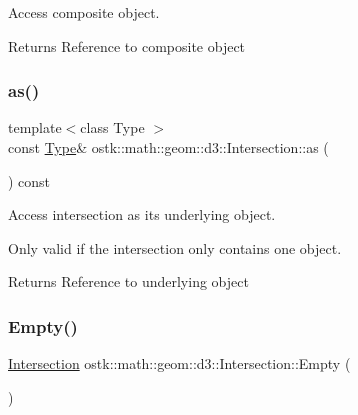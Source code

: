 Access composite object. 

\begin{DoxyReturn}{Returns}
Reference to composite object 
\end{DoxyReturn}
\mbox{\label{classostk_1_1math_1_1geom_1_1d3_1_1_intersection_a4be3a53127df9940bc2eb61777b22b33}} 
\subsubsection{\texorpdfstring{as()}{as()}}
{\footnotesize\ttfamily template$<$class Type $>$ \\
const \hyperlink{classostk_1_1math_1_1geom_1_1d3_1_1_intersection_a21196aae3f56795cb11d07afaaaf41c1}{Type}\& ostk\+::math\+::geom\+::d3\+::\+Intersection\+::as (\begin{DoxyParamCaption}{ }\end{DoxyParamCaption}) const\hspace{0.3cm}{\ttfamily [inline]}}



Access intersection as its underlying object. 

Only valid if the intersection only contains one object.

\begin{DoxyReturn}{Returns}
Reference to underlying object 
\end{DoxyReturn}
\mbox{\label{classostk_1_1math_1_1geom_1_1d3_1_1_intersection_ae5b56e75e89a76e9d67827dd99cd777f}} 
\subsubsection{\texorpdfstring{Empty()}{Empty()}}
{\footnotesize\ttfamily \hyperlink{classostk_1_1math_1_1geom_1_1d3_1_1_intersection}{Intersection} ostk\+::math\+::geom\+::d3\+::\+Intersection\+::\+Empty (\begin{DoxyParamCaption}{ }\end{DoxyParamCaption})\hspace{0.3cm}{\ttfamily [static]}}



